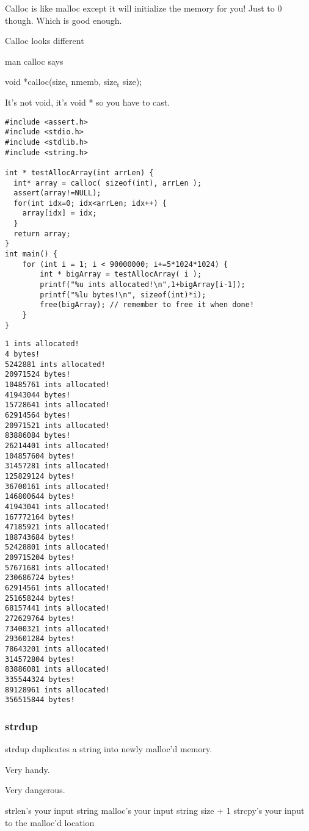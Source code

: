 \documentclass[11pt]{article}
\begin{document}
Calloc is like malloc except it will initialize the memory for you!
Just to 0 though. Which is good enough.

Calloc looks different 

man calloc says

void *calloc(size\(_{\text{t}}\) nmemb, size\(_{\text{t}}\) size);

It's not void, it's void * so you have to cast.

\begin{verbatim}
#include <assert.h>
#include <stdio.h>
#include <stdlib.h>
#include <string.h>

int * testAllocArray(int arrLen) {
  int* array = calloc( sizeof(int), arrLen );
  assert(array!=NULL);
  for(int idx=0; idx<arrLen; idx++) {
    array[idx] = idx;
  }
  return array;
}
int main() {
    for (int i = 1; i < 90000000; i+=5*1024*1024) {
        int * bigArray = testAllocArray( i );
        printf("%u ints allocated!\n",1+bigArray[i-1]);
        printf("%lu bytes!\n", sizeof(int)*i);
        free(bigArray); // remember to free it when done!
    }
}
\end{verbatim}

\begin{verbatim}
1 ints allocated!
4 bytes!
5242881 ints allocated!
20971524 bytes!
10485761 ints allocated!
41943044 bytes!
15728641 ints allocated!
62914564 bytes!
20971521 ints allocated!
83886084 bytes!
26214401 ints allocated!
104857604 bytes!
31457281 ints allocated!
125829124 bytes!
36700161 ints allocated!
146800644 bytes!
41943041 ints allocated!
167772164 bytes!
47185921 ints allocated!
188743684 bytes!
52428801 ints allocated!
209715204 bytes!
57671681 ints allocated!
230686724 bytes!
62914561 ints allocated!
251658244 bytes!
68157441 ints allocated!
272629764 bytes!
73400321 ints allocated!
293601284 bytes!
78643201 ints allocated!
314572804 bytes!
83886081 ints allocated!
335544324 bytes!
89128961 ints allocated!
356515844 bytes!
\end{verbatim}

\subsubsection{strdup}
\label{sec:orgc1f86c2}

strdup duplicates a string into newly malloc'd memory.

Very handy.

Very dangerous.

strlen's your input string
malloc's your input string size + 1
strcpy's your input to the malloc'd location
\end{document}
